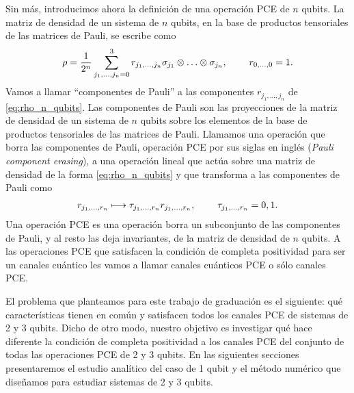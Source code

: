 Sin más, introducimos ahora la definición de una operación PCE de 
$n$ qubits. La matriz de densidad de un sistema de $n$ qubits, en la base de
productos tensoriales de las matrices de Pauli, se escribe como
\begin{align}\label{eq:rho_n_qubits}
\rho=\frac{1}{2^n}\sum_{j_1,\ldots,j_n=0}^3
r_{j_1,\ldots,j_n}\sigma_{j_1}\otimes\ldots\otimes\sigma_{j_n},
\hspace{.8cm} r_{0,\ldots,0}=1.
\end{align}
Vamos a llamar ``componentes de Pauli'' a las componentes $r_{j_1,\ldots,j_n}$
de \eqref{eq:rho_n_qubits}. Las componentes de Pauli son las proyecciones
de la matriz de densidad de un sistema de $n$ qubits sobre los elementos
de la base de productos tensoriales de las matrices de Pauli.
Llamamos una operación que borra las componentes de Pauli, 
operación PCE por sus siglas en inglés (\textit{Pauli
component erasing}), a una operación lineal que actúa sobre una 
matriz de densidad de la forma \eqref{eq:rho_n_qubits} y 
que transforma a las componentes de Pauli como
\begin{align}
r_{j_1,\ldots,r_n}\longmapsto \tau_{j_1,\ldots,r_n}r_{j_1,\ldots,r_n},
\hspace{.8cm} \tau_{j_1,\ldots,r_n} = 0,1.
\end{align}
Una operación PCE es una operación borra un subconjunto de las 
componentes de Pauli, y al resto las deja invariantes, de la matriz 
de densidad de $n$ qubits. A las operaciones PCE que satisfacen 
la condición de completa positividad para ser un canales cuántico
les vamos a llamar canales cuánticos PCE o sólo canales PCE.

El problema que planteamos para este trabajo de graduación es
el siguiente: qué características tienen en común y satisfacen todos 
los canales PCE de sistemas de 2 y 3 qubits. Dicho de otro modo, 
nuestro objetivo es investigar qué hace diferente la condición de 
completa positividad a los canales PCE del conjunto de todas las 
operaciones PCE de 2 y 3 qubits.
En las siguientes secciones presentaremos el estudio analítico del 
caso de 1 qubit y el método numérico que diseñamos 
para estudiar sistemas de 2 y 3 qubits. 




